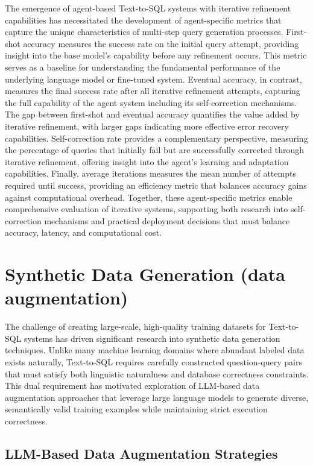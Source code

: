 The emergence of agent-based Text-to-SQL systems with iterative refinement capabilities has necessitated the development of agent-specific metrics that capture the unique characteristics of multi-step query generation processes. First-shot accuracy measures the success rate on the initial query attempt, providing insight into the base model's capability before any refinement occurs. This metric serves as a baseline for understanding the fundamental performance of the underlying language model or fine-tuned system. Eventual accuracy, in contrast, measures the final success rate after all iterative refinement attempts, capturing the full capability of the agent system including its self-correction mechanisms. The gap between first-shot and eventual accuracy quantifies the value added by iterative refinement, with larger gaps indicating more effective error recovery capabilities. Self-correction rate provides a complementary perspective, measuring the percentage of queries that initially fail but are successfully corrected through iterative refinement, offering insight into the agent's learning and adaptation capabilities. Finally, average iterations measures the mean number of attempts required until success, providing an efficiency metric that balances accuracy gains against computational overhead. Together, these agent-specific metrics enable comprehensive evaluation of iterative systems, supporting both research into self-correction mechanisms and practical deployment decisions that must balance accuracy, latency, and computational cost.


\section{Synthetic Data Generation (data augmentation)}


The challenge of creating large-scale, high-quality training datasets for Text-to-SQL systems has driven significant research into synthetic data generation techniques. Unlike many machine learning domains where abundant labeled data exists naturally, Text-to-SQL requires carefully constructed question-query pairs that must satisfy both linguistic naturalness and database correctness constraints. This dual requirement has motivated exploration of LLM-based data augmentation approaches that leverage large language models to generate diverse, semantically valid training examples while maintaining strict execution correctness.

\subsection{LLM-Based Data Augmentation Strategies}

